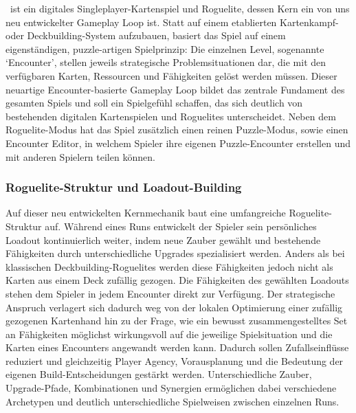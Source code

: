 
\coc\ ist ein digitales Singleplayer-Kartenspiel und Roguelite, dessen Kern ein von uns neu entwickelter Gameplay Loop ist.
Statt auf einem etablierten Kartenkampf- oder Deckbuilding-System aufzubauen, basiert das Spiel auf einem eigenständigen, puzzle-artigen Spielprinzip:
Die einzelnen Level, sogenannte `Encounter', stellen jeweils strategische Problemsituationen dar, die mit den verfügbaren Karten, Ressourcen und Fähigkeiten gelöst werden müssen.
Dieser neuartige Encounter-basierte Gameplay Loop bildet das zentrale Fundament des gesamten Spiels und soll ein Spielgefühl schaffen, das sich deutlich von bestehenden digitalen Kartenspielen und Roguelites unterscheidet.
Neben dem Roguelite-Modus hat das Spiel zusätzlich einen reinen Puzzle-Modus, sowie einen Encounter Editor, in welchem Spieler ihre eigenen Puzzle-Encounter erstellen und mit anderen Spielern teilen können.

\subsubsection*{Roguelite-Struktur und Loadout-Building}
Auf dieser neu entwickelten Kernmechanik baut eine umfangreiche Roguelite-Struktur auf.
Während eines Runs entwickelt der Spieler sein persönliches Loadout kontinuierlich weiter, indem neue Zauber gewählt und bestehende Fähigkeiten durch unterschiedliche Upgrades spezialisiert werden.
Anders als bei klassischen Deckbuilding-Roguelites werden diese Fähigkeiten jedoch nicht als Karten aus einem Deck zufällig gezogen. Die Fähigkeiten des gewählten Loadouts stehen dem Spieler in jedem Encounter direkt zur Verfügung. Der strategische Anspruch verlagert sich dadurch weg von der lokalen Optimierung einer zufällig gezogenen Kartenhand hin zu der Frage, wie ein bewusst zusammengestelltes Set an Fähigkeiten möglichst wirkungsvoll auf die jeweilige Spielsituation und die Karten eines Encounters angewandt werden kann. Dadurch sollen Zufallseinflüsse reduziert und gleichzeitig Player Agency, Vorausplanung und die Bedeutung der eigenen Build-Entscheidungen gestärkt werden.
Unterschiedliche Zauber, Upgrade-Pfade, Kombinationen und Synergien ermöglichen dabei verschiedene Archetypen und deutlich unterschiedliche Spielweisen zwischen einzelnen Runs.

